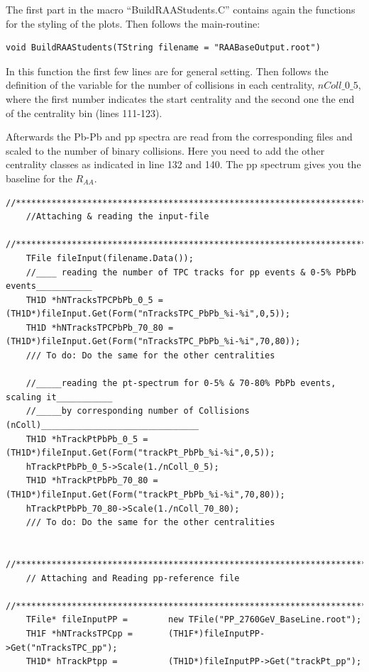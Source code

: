 \documentclass{article}
\begin{document}
The first part in the macro ``BuildRAAStudents.C'' contains again the 
functions for the styling of the plots. Then follows the main-routine: 

\begin{lstlisting}[firstnumber=101]
void BuildRAAStudents(TString filename = "RAABaseOutput.root")
\end{lstlisting}

In this function the first few lines are for general setting. Then follows the 
definition of the variable for the number of collisions in each centrality, 
$nColl\_0\_5$, where the first number indicates the start centrality and the 
second one the end of the centrality bin (lines 111-123).

Afterwards the Pb-Pb and pp spectra are read from the corresponding files and 
scaled to the number of binary collisions. Here you need to add the other 
centrality classes as indicated in line 132 and 140. The pp spectrum gives you 
the baseline for the $R_{AA}$. 

\begin{lstlisting}[firstnumber=125]
 	//*********************************************************************************
	//Attaching & reading the input-file
	//*********************************************************************************   
	TFile fileInput(filename.Data());  
	//____ reading the number of TPC tracks for pp events & 0-5% PbPb events___________
	TH1D *hNTracksTPCPbPb_0_5 =			(TH1D*)fileInput.Get(Form("nTracksTPC_PbPb_%i-%i",0,5));
	TH1D *hNTracksTPCPbPb_70_80 =			(TH1D*)fileInput.Get(Form("nTracksTPC_PbPb_%i-%i",70,80));
	/// To do: Do the same for the other centralities 
	
	//_____reading the pt-spectrum for 0-5% & 70-80% PbPb events, scaling it___________
	//_____by corresponding number of Collisions (nColl)_______________________________
	TH1D *hTrackPtPbPb_0_5 =			(TH1D*)fileInput.Get(Form("trackPt_PbPb_%i-%i",0,5));
	hTrackPtPbPb_0_5->Scale(1./nColl_0_5);
	TH1D *hTrackPtPbPb_70_80 =			(TH1D*)fileInput.Get(Form("trackPt_PbPb_%i-%i",70,80));
	hTrackPtPbPb_70_80->Scale(1./nColl_70_80);
	/// To do: Do the same for the other centralities 
	
	//*********************************************************************************
	// Attaching and Reading pp-reference file
	//*********************************************************************************   
	TFile* fileInputPP = 		new TFile("PP_2760GeV_BaseLine.root");
	TH1F *hNTracksTPCpp = 		(TH1F*)fileInputPP->Get("nTracksTPC_pp");	
	TH1D* hTrackPtpp = 			(TH1D*)fileInputPP->Get("trackPt_pp");	
\end{lstlisting}
\end{document}

